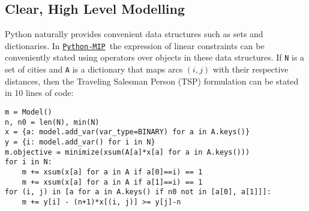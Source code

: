 \documentclass{article}
\def\PythonMIP{\href{https://github.com/coin-or/python-mip}{\texttt{Python-MIP}}}
\begin{document}
\subsection{Clear, High Level Modelling}
Python naturally provides convenient data structures such as sets and dictionaries. In \PythonMIP\ the expression of linear constraints can be conveniently stated using operators over objects in these data structures. If \texttt{N} is a set of cities and \texttt{A} is a dictionary that maps arcs $(i,j)$ with their respective distances, then the Traveling Salesman Person (TSP) formulation\cite{Miller1960} can be stated in 10 lines of code:

\begin{verbatim}
m = Model()
n, n0 = len(N), min(N) 
x = {a: model.add_var(var_type=BINARY) for a in A.keys()}
y = {i: model.add_var() for i in N}
m.objective = minimize(xsum(A[a]*x[a] for a in A.keys()))
for i in N:
    m += xsum(x[a] for a in A if a[0]==i) == 1
    m += xsum(x[a] for a in A if a[1]==i) == 1
for (i, j) in [a for a in A.keys() if n0 not in [a[0], a[1]]]:
    m += y[i] - (n+1)*x[(i, j)] >= y[j]-n
\end{verbatim}
\end{document}
